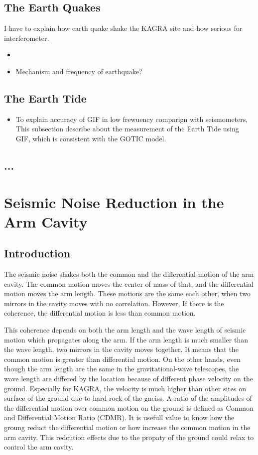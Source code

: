 \documentclass[a4paper,12pt]{book}
\begin{document}
\subsection{The Earth Quakes}
I have to explain how earth quake shake the KAGRA site and how serious for interferometer.
\begin{itemize}
\item 
\item Mechanism and frequency of earthquake?
\end{itemize}

\subsection{The Earth Tide}

\begin{itemize}
  \item To explain accuracy of GIF in low frewuency comparign with seismometers, This subsection describe about the measurement of the Earth Tide using GIF, which is consistent with the GOTIC model.
\end{itemize}

\subsection{...}
\section{Seismic Noise Reduction in the Arm Cavity}
\subsection{Introduction}
The seismic noise shakes both the common and the differential motion of the arm cavity. The common motion moves the center of mass of that, and the differential motion moves the arm length. These motions are the same each other, when two mirrors in the cavity moves with no correlation. However, If there is the coherence, the differential motion is less than common motion. 

This coherence depends on both the arm length and the wave length of seismic motion which propagates along the arm. If the arm length is much smaller than the wave length, two mirrors in the cavity moves together. It means that the common motion is greater than differential motion. On the other hands, even though the arm length are the same in the gravitational-wave telescopes, the wave length are differed by the location because of different phase velocity on the ground. Especially for KAGRA, the velocity is much higher than other sites on surface of the ground due to hard rock of the gneiss. A ratio of the amplitudes of the differential motion over common motion on the ground is defined as Common and Differential Motion Ratio (CDMR). It is usefull value to know how the groung reduct the differential motion or how increase the common motion in the arm cavity. This redcution effects due to the propaty of the ground could relax to control the arm cavity.
\end{document}

